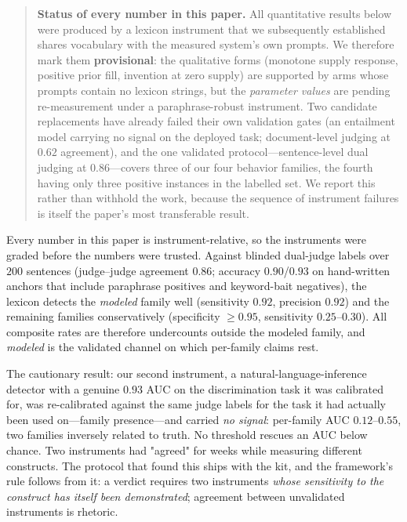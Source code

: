\documentclass[11pt]{article}
\begin{document}
\begin{quote}
\small\textbf{Status of every number in this paper.} All quantitative
results below were produced by a lexicon instrument that we subsequently
established shares vocabulary with the measured system's own prompts. We
therefore mark them \textbf{provisional}: the qualitative forms
(monotone supply response, positive prior fill, invention at zero supply)
are supported by arms whose prompts contain no lexicon strings, but the
\emph{parameter values} are pending re-measurement under a
paraphrase-robust instrument. Two candidate replacements have already
failed their own validation gates (an entailment model carrying no signal
on the deployed task; document-level judging at $0.62$ agreement), and the
one validated protocol---sentence-level dual judging at $0.86$---covers
three of our four behavior families, the fourth having only three
positive instances in the labelled set. We report this rather than
withhold the work, because the sequence of instrument failures is itself
the paper's most transferable result.
\end{quote}

Every number in this paper is instrument-relative, so the instruments were
graded before the numbers were trusted. Against blinded dual-judge labels
over $200$ sentences (judge--judge agreement $0.86$; accuracy $0.90$/$0.93$
on hand-written anchors that include paraphrase positives and keyword-bait
negatives), the lexicon detects the \emph{modeled} family well (sensitivity
$0.92$, precision $0.92$) and the remaining families conservatively
(specificity $\geq 0.95$, sensitivity $0.25$--$0.30$). All composite rates
are therefore undercounts outside the modeled family, and \emph{modeled} is
the validated channel on which per-family claims rest.

The cautionary result: our second instrument, a natural-language-inference
detector with a genuine $0.93$ AUC on the discrimination task it was
calibrated for, was re-calibrated against the same judge labels for the task
it had actually been used on---family presence---and carried \emph{no
signal}: per-family AUC $0.12$--$0.55$, two families inversely related to
truth. No threshold rescues an AUC below chance. Two instruments had
"agreed" for weeks while measuring different constructs. The protocol that
found this ships with the kit, and the framework's rule follows from it:
a verdict requires two instruments \emph{whose sensitivity to the construct
has itself been demonstrated}; agreement between unvalidated instruments is
rhetoric.
\end{document}
